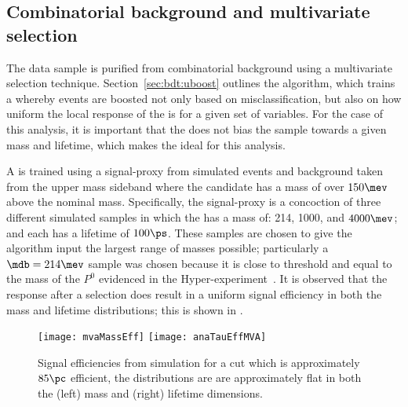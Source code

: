 


\subsection{Combinatorial background and multivariate selection}
The data sample is purified from combinatorial background using a multivariate selection technique.
Section~\ref{sec:bdt:uboost} outlines the \uBDT algorithm, which trains a \BDT whereby events are
boosted not only based on misclassification, but also on how uniform the local response of the \BDT
is for a given set of variables.
For the case of this analysis, it is important that the \BDT does not bias the sample towards a
given mass and
lifetime, which makes the \uBDT ideal for this analysis.

A \uBDT is trained using a signal-proxy from simulated events and background taken from the upper
\Bd mass sideband where the \Bd candidate has a mass of over $150\mev$ above the nominal \Bd mass.
Specifically, the signal-proxy is a concoction of three different simulated samples in which the
\db has a mass of: 214, 1000, and $4000\mev$; and each has a lifetime of $100\ps$.
These samples are chosen to give the \uBDT algorithm input the largest range of masses possible;
particularly a $\mdb=214\mev$ sample was chosen because it is close to threshold and equal to the
mass of the $P^0$ evidenced in the Hyper-\CP experiment~\cite{Park:2005eka}.
It is observed that the response after a \uBDT selection does result in a uniform signal efficiency
in both
the mass and lifetime distributions; this is shown in .

\begin{figure}
  \begin{center}
    \texttt{[image: mvaMassEff]}
    \texttt{[image: anaTauEffMVA]}
    \caption[Signal efficiency of a uBDT cut as a function of mass and lifetime]
    {
      Signal efficiencies from simulation for a \uBDT cut which is approximately $85\pc$ efficient,
      the distributions are are approximately flat in both the (left) mass and (right) lifetime
      dimensions.
    }
    \label{fig:db:bdtflat}
  \end{center}
\end{figure}

